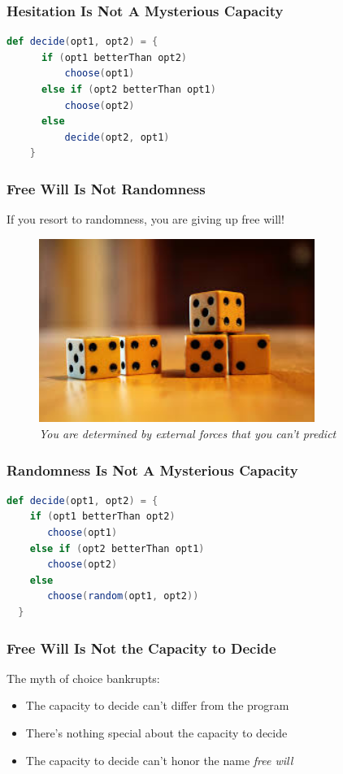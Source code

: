 \documentclass[xcolor=dvipsnames]{beamer}
\theoremstyle{definition}
\begin{document}
\begin{frame}[fragile]
  \frametitle{Hesitation Is Not A Mysterious Capacity}

  \begin{lstlisting}[language=Scala]
    def decide(opt1, opt2) = {
      if (opt1 betterThan opt2)
          choose(opt1)
      else if (opt2 betterThan opt1)
          choose(opt2)
      else
          decide(opt2, opt1)
    }
  \end{lstlisting}
\end{frame}

\begin{frame}[fragile]
  \frametitle{Free Will Is Not Randomness}
  If you resort to randomness, you are giving up free will!

  \begin{figure}
    \centering
    \includegraphics[width=0.8\textwidth]{images/dice.jpg}\\
    \emph{You are determined by external forces that you can't predict}
  \end{figure}
\end{frame}

\begin{frame}[fragile]
  \frametitle{Randomness Is Not A Mysterious Capacity}

  \begin{lstlisting}[language=Scala]
  def decide(opt1, opt2) = {
    if (opt1 betterThan opt2)
       choose(opt1)
    else if (opt2 betterThan opt1)
       choose(opt2)
    else
       choose(random(opt1, opt2))
  }
  \end{lstlisting}
\end{frame}

\begin{frame}[fragile]
  \frametitle{Free Will Is Not the Capacity to Decide}

  The \alert{myth of choice} bankrupts:
  \begin{itemize}
  \item The capacity to decide can't differ from the program
  \item There's nothing special about the capacity to decide
  \item The capacity to decide can't honor the name \emph{free will}
  \end{itemize}
\end{frame}
\end{document}
